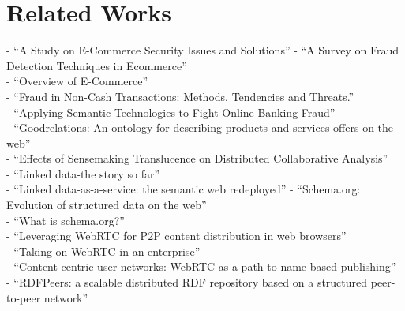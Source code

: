 
\chapter{Related Works}
\label{cha:related_works}
- ``A Study on E-Commerce Security Issues and Solutions'' \citep{sen2015study}
- ``A Survey on Fraud Detection Techniques in Ecommerce'' \citep{rana2015survey} \\
- ``Overview of E-Commerce'' \citep{ankhule2015overview} \\
- ``Fraud in Non-Cash Transactions: Methods, Tendencies and Threats.'' \citep{sobko2014fraud} \\
- ``Applying Semantic Technologies to Fight Online Banking Fraud'' \citep{carvalhoapplying} \\
- ``Goodrelations: An ontology for describing products and services offers on the web'' \citep{hepp2008goodrelations} \\
- ``Effects of Sensemaking Translucence on Distributed Collaborative Analysis'' \citep{goyaleffects} \\
- ``Linked data-the story so far'' \citep{bizer2009linked} \\
- ``Linked data-as-a-service: the semantic web redeployed'' \citep{rietveld2015linked}
- ``Schema.org: Evolution of structured data on the web'' \citep{guha2016schema} \\
- ``What is schema.org?'' \citep{barker2014schema} \\
- ``Leveraging WebRTC for P2P content distribution in web browsers'' \citep{vogt2013leveraging} \\
- ``Taking on WebRTC in an enterprise'' \citep{vogt2013leveraging} \\
- ``Content-centric user networks: WebRTC as a path to name-based publishing'' \citep{vogt2013content} \\
- ``RDFPeers: a scalable distributed RDF repository based on a structured peer-to-peer network'' \citep{cai2004rdfpeers}

